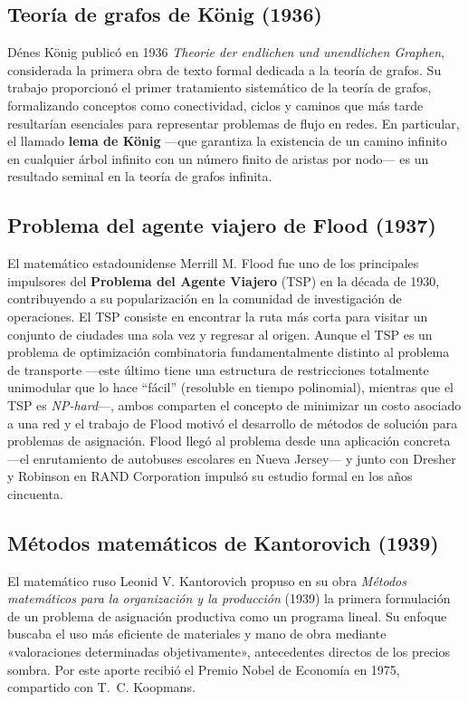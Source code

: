 \documentclass[10pt,letterpaper,twocolumn]{article}
\begin{document}
\subsection{Teoría de grafos de König (1936)}
Dénes König publicó en 1936 \emph{Theorie der endlichen und unendlichen Graphen}, considerada la primera obra de texto formal dedicada a la teoría de grafos. Su trabajo proporcionó el primer tratamiento sistemático de la teoría de grafos, formalizando conceptos como conectividad, ciclos y caminos que más tarde resultarían esenciales para representar problemas de flujo en redes. En particular, el llamado \textbf{lema de König} —que garantiza la existencia de un camino infinito en cualquier árbol infinito con un número finito de aristas por nodo— es un resultado seminal en la teoría de grafos infinita.

\subsection{Problema del agente viajero de Flood (1937)}
El matemático estadounidense Merrill M. Flood fue uno de los principales impulsores del \textbf{Problema del Agente Viajero} (TSP) en la década de 1930, contribuyendo a su popularización en la comunidad de investigación de operaciones. El TSP consiste en encontrar la ruta más corta para visitar un conjunto de ciudades una sola vez y regresar al origen. Aunque el TSP es un problema de optimización combinatoria fundamentalmente distinto al problema de transporte —este último tiene una estructura de restricciones totalmente unimodular que lo hace ``fácil'' (resoluble en tiempo polinomial), mientras que el TSP es \emph{NP-hard}—, ambos comparten el concepto de minimizar un costo asociado a una red y el trabajo de Flood motivó el desarrollo de métodos de solución para problemas de asignación. Flood llegó al problema desde una aplicación concreta —el enrutamiento de autobuses escolares en Nueva Jersey— y junto con Dresher y Robinson en RAND Corporation impulsó su estudio formal en los años cincuenta.

\subsection{Métodos matemáticos de Kantorovich (1939)}
El matemático ruso Leonid V. Kantorovich propuso en su obra \emph{Métodos matemáticos para la organización y la producción} (1939) la primera formulación de un problema de asignación productiva como un programa lineal. Su enfoque buscaba el uso más eficiente de materiales y mano de obra mediante «valoraciones determinadas objetivamente», antecedentes directos de los precios sombra. Por este aporte recibió el Premio Nobel de Economía en 1975, compartido con T.~C. Koopmans.
\end{document}

